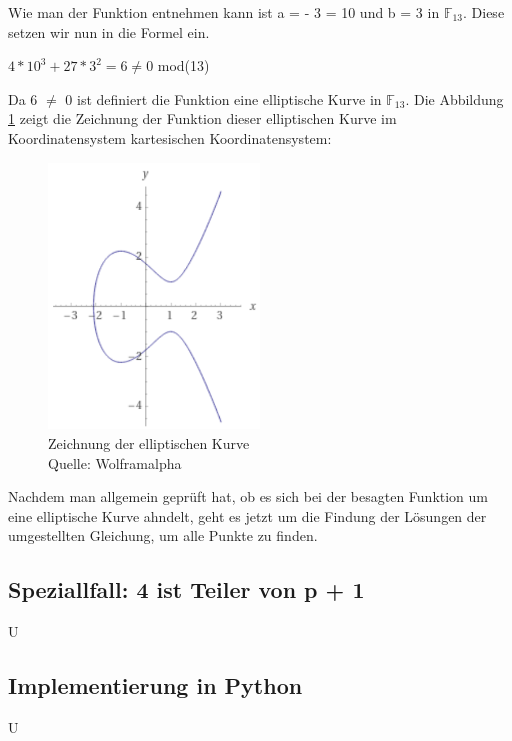 Wie man der Funktion entnehmen kann ist a = - 3 = 10 und b = 3 in $\mathbb{F}_{13}$. Diese setzen wir nun in die Formel ein.
\begin{center}
$4 * 10^3 + 27 * 3^2 = 6 \neq 0$ mod(13)
\end{center} 

Da 6 $\neq$ 0 ist definiert die Funktion eine elliptische Kurve in $\mathbb{F}_{13}$. Die Abbildung \ref{fig:kurve_beispiel_1_punktberechnung} zeigt die Zeichnung der Funktion dieser elliptischen Kurve im Koordinatensystem kartesischen Koordinatensystem: 

\begin{figure}[H]
    \centering
    \includegraphics[width=0.5\textwidth]{grafiken/kurve_beispiel_1_punktberechnung.png}
    \caption[Zeichnung der elliptischen Kurve]{Zeichnung der elliptischen Kurve \\ Quelle: Wolframalpha}
    \label{fig:kurve_beispiel_1_punktberechnung}
\end{figure}

Nachdem man allgemein geprüft hat, ob es sich bei der besagten Funktion um eine elliptische Kurve ahndelt, geht es jetzt um die Findung der Lösungen der umgestellten Gleichung, um alle Punkte zu finden. 


\subsection{Speziallfall: 4 ist Teiler von p + 1}
U

\subsection{Implementierung in Python}
U





































